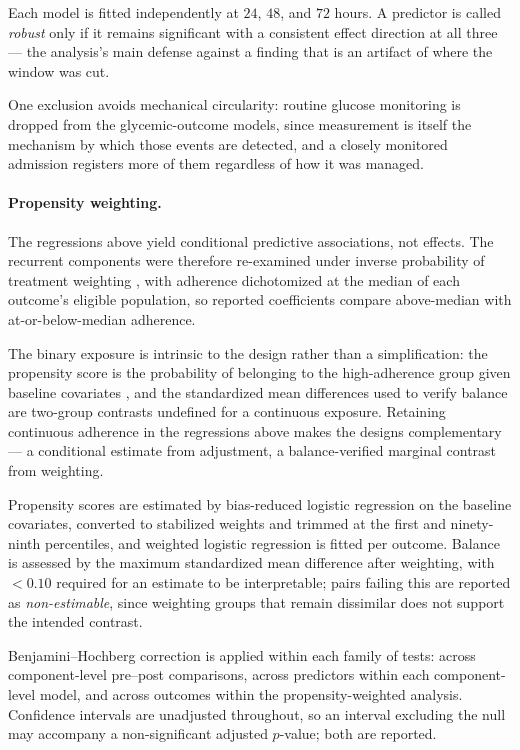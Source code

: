 Each model is fitted independently at $24$, $48$, and $72$ hours. A predictor is called \emph{robust} only if it remains significant with a consistent effect direction at all three --- the analysis's main defense against a finding that is an artifact of where the window was cut.

One exclusion avoids mechanical circularity: routine glucose monitoring is dropped from the glycemic-outcome models, since measurement is itself the mechanism by which those events are detected, and a closely monitored admission registers more of them regardless of how it was managed.

\paragraph{Propensity weighting.}
The regressions above yield conditional predictive associations, not effects. The recurrent components were therefore re-examined under inverse probability of treatment weighting \citep{rosenbaum1983central, austin2015moving}, with adherence dichotomized at the median of each outcome's eligible population, so reported coefficients compare above-median with at-or-below-median adherence.

The binary exposure is intrinsic to the design rather than a simplification: the propensity score is the probability of belonging to the high-adherence group given baseline covariates \citep{rosenbaum1983central}, and the standardized mean differences used to verify balance \citep{austin2009balance} are two-group contrasts undefined for a continuous exposure. Retaining continuous adherence in the regressions above makes the designs complementary --- a conditional estimate from adjustment, a balance-verified marginal contrast from weighting.

Propensity scores are estimated by bias-reduced logistic regression on the baseline covariates, converted to stabilized weights and trimmed at the first and ninety-ninth percentiles, and weighted logistic regression is fitted per outcome. Balance is assessed by the maximum standardized mean difference after weighting, with $<0.10$ required for an estimate to be interpretable; pairs failing this are reported as \emph{non-estimable}, since weighting groups that remain dissimilar does not support the intended contrast.

Benjamini--Hochberg correction is applied within each family of tests: across component-level pre--post comparisons, across predictors within each component-level model, and across outcomes within the propensity-weighted analysis. Confidence intervals are unadjusted throughout, so an interval excluding the null may accompany a non-significant adjusted $p$-value; both are reported.

